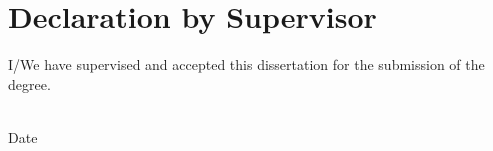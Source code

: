 \chapter*{Declaration by Supervisor}

\begin{flushleft}
	I/We have supervised and accepted this dissertation for the submission of the degree. 
	\vspace{15mm}
	
	{\makebox[6.5cm]{\dotfill}} \hfill {\makebox[5cm]{\dotfill}}  \\ 
	\supervisorA \hfill Date \\
	
	
	
	
\end{flushleft}
